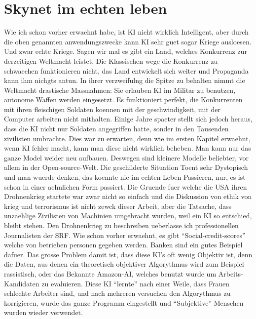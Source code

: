 \documentclass{report}
\begin{document}
\section{Skynet im echten leben}
Wie ich schon vorher erwaehnt habe, ist KI nicht wirklich Intelligent, aber durch die oben genannten anwendungszwecke kann KI sehr guet sogar Kriege ausloesen. Und zwar echte Kriege.
\newline
Sagen wir mal es gibt ein Land, welches Konkurrenz zur derzeitigen Weltmacht leistet. Die Klassischen wege die Konkurrenz zu schwaechen funktionieren nicht, das Land entwickelt sich weiter und Propaganda kann ihm nichgts antun. In ihrer verzweifulng die Spitze zu behalten nimmt die Weltmacht drastische Massnahmen: Sie erlauben KI im Militar zu benutzen, autonome Waffen werden eingesetzt. Es funktioniert perfekt, die Konkurrenten mit ihren fleischigen Soldaten koennen mit der geschwindigkeit, mit der Computer arbeiten nicht mithalten. Einige Jahre spaeter stellt sich jedoch heraus, dass die KI nicht nur Soldaten angegriffen hatte, sonder in den Tausenden zivilisten umbrachte. Dies war zu erwarten, denn wie im ersten Kapitel erwaehnt, wenn KI fehler macht, kann man diese nicht wirklich beheben. Man kann nur das ganze Model weider neu aufbauen. Deswegen sind kleinere Modelle beliebter, vor allem in der Open-source-Welt.
\newline
\newline
Die geschilderte Situation Toent sehr Dystopisch und man wuerde denken, das koennte nie im echten Leben Passieren, nur, es ist schon in einer aehnlichen Form passiert. Die Gruende fuer welche die USA ihren Drohnenkrieg startete war zwar nicht so einfach und die Diskussion von ethik von krieg und terrorismus ist nicht zewck dieser Arbeit, aber die Tatsache, dass unzaehlige Zivilisten von Machinien umgebracht wurden, weil ein KI so entschied, bleibt stehen.
Den Drohnenkrieg zu beschreiben ueberlasse ich professionellen Journalisten der SRF. \citep{drones-srf}
\newline
Wie schon vorher erwaehnt, es gibt \enquote{Social-credit-scores} welche von betrieben personen gegeben werden. Banken sind ein gutes Beispiel dafuer. Das grosse Problem damit ist, dass diese KI's oft wenig Objektiv ist, denn die Daten, aus denen ein theoretisch objektiver Algorythmus wird zum Beispiel rassistisch, oder das Bekannte Amazon-AI, welches benutzt wurde um Arbeits-Kandidaten zu evaluieren. Diese KI \enquote{lernte} nach einer Weile, dass Frauen schlechte Arbeiter sind, und nach mehreren versuchen den Algorythmus zu korrigieren, wurde das ganze Programm eingestellt und \enquote{Subjektive} Menschen wurden wieder verwendet.
\end{document}
